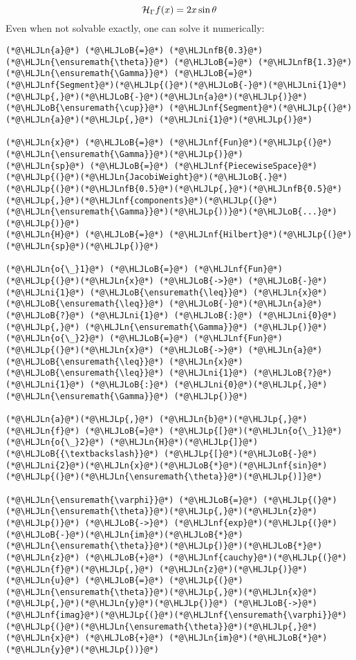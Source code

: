 \documentclass[12pt,landscape]{article}
\newcommand{\HLJLn}[1]{#1}
\newcommand{\HLJLnf}[1]{\textcolor[RGB]{66,102,213}{#1}}
\newcommand{\HLJLnfB}[1]{\textcolor[RGB]{59,151,46}{#1}}
\newcommand{\HLJLni}[1]{\textcolor[RGB]{59,151,46}{#1}}
\newcommand{\HLJLoB}[1]{\textcolor[RGB]{102,102,102}{\textbf{#1}}}
\newcommand{\HLJLp}[1]{#1}
\def\HH{ {\cal H} }
\begin{document}
{\[
\HH_\Gamma f(x) = 2 x  \sin \theta
\]
Even when not solvable exactly, one can solve it numerically:


\begin{lstlisting}
(*@\HLJLn{a}@*) (*@\HLJLoB{=}@*) (*@\HLJLnfB{0.3}@*)
(*@\HLJLn{\ensuremath{\theta}}@*) (*@\HLJLoB{=}@*) (*@\HLJLnfB{1.3}@*)
(*@\HLJLn{\ensuremath{\Gamma}}@*) (*@\HLJLoB{=}@*) (*@\HLJLnf{Segment}@*)(*@\HLJLp{(}@*)(*@\HLJLoB{-}@*)(*@\HLJLni{1}@*)(*@\HLJLp{,}@*)(*@\HLJLoB{-}@*)(*@\HLJLn{a}@*)(*@\HLJLp{)}@*) (*@\HLJLoB{\ensuremath{\cup}}@*) (*@\HLJLnf{Segment}@*)(*@\HLJLp{(}@*)(*@\HLJLn{a}@*)(*@\HLJLp{,}@*) (*@\HLJLni{1}@*)(*@\HLJLp{)}@*)

(*@\HLJLn{x}@*) (*@\HLJLoB{=}@*) (*@\HLJLnf{Fun}@*)(*@\HLJLp{(}@*)(*@\HLJLn{\ensuremath{\Gamma}}@*)(*@\HLJLp{)}@*)
(*@\HLJLn{sp}@*) (*@\HLJLoB{=}@*) (*@\HLJLnf{PiecewiseSpace}@*)(*@\HLJLp{(}@*)(*@\HLJLn{JacobiWeight}@*)(*@\HLJLoB{.}@*)(*@\HLJLp{(}@*)(*@\HLJLnfB{0.5}@*)(*@\HLJLp{,}@*)(*@\HLJLnfB{0.5}@*)(*@\HLJLp{,}@*)(*@\HLJLnf{components}@*)(*@\HLJLp{(}@*)(*@\HLJLn{\ensuremath{\Gamma}}@*)(*@\HLJLp{))}@*)(*@\HLJLoB{...}@*)(*@\HLJLp{)}@*)
(*@\HLJLn{H}@*) (*@\HLJLoB{=}@*) (*@\HLJLnf{Hilbert}@*)(*@\HLJLp{(}@*)(*@\HLJLn{sp}@*)(*@\HLJLp{)}@*)

(*@\HLJLn{o{\_}1}@*) (*@\HLJLoB{=}@*) (*@\HLJLnf{Fun}@*)(*@\HLJLp{(}@*)(*@\HLJLn{x}@*) (*@\HLJLoB{->}@*) (*@\HLJLoB{-}@*)(*@\HLJLni{1}@*) (*@\HLJLoB{\ensuremath{\leq}}@*) (*@\HLJLn{x}@*) (*@\HLJLoB{\ensuremath{\leq}}@*) (*@\HLJLoB{-}@*)(*@\HLJLn{a}@*) (*@\HLJLoB{?}@*) (*@\HLJLni{1}@*) (*@\HLJLoB{:}@*) (*@\HLJLni{0}@*)(*@\HLJLp{,}@*) (*@\HLJLn{\ensuremath{\Gamma}}@*) (*@\HLJLp{)}@*)
(*@\HLJLn{o{\_}2}@*) (*@\HLJLoB{=}@*) (*@\HLJLnf{Fun}@*)(*@\HLJLp{(}@*)(*@\HLJLn{x}@*) (*@\HLJLoB{->}@*) (*@\HLJLn{a}@*) (*@\HLJLoB{\ensuremath{\leq}}@*) (*@\HLJLn{x}@*) (*@\HLJLoB{\ensuremath{\leq}}@*) (*@\HLJLni{1}@*) (*@\HLJLoB{?}@*) (*@\HLJLni{1}@*) (*@\HLJLoB{:}@*) (*@\HLJLni{0}@*)(*@\HLJLp{,}@*) (*@\HLJLn{\ensuremath{\Gamma}}@*) (*@\HLJLp{)}@*)

(*@\HLJLn{a}@*)(*@\HLJLp{,}@*) (*@\HLJLn{b}@*)(*@\HLJLp{,}@*) (*@\HLJLn{f}@*) (*@\HLJLoB{=}@*) (*@\HLJLp{[}@*)(*@\HLJLn{o{\_}1}@*) (*@\HLJLn{o{\_}2}@*) (*@\HLJLn{H}@*)(*@\HLJLp{]}@*) (*@\HLJLoB{{\textbackslash}}@*) (*@\HLJLp{[}@*)(*@\HLJLoB{-}@*)(*@\HLJLni{2}@*)(*@\HLJLn{x}@*)(*@\HLJLoB{*}@*)(*@\HLJLnf{sin}@*)(*@\HLJLp{(}@*)(*@\HLJLn{\ensuremath{\theta}}@*)(*@\HLJLp{)]}@*)

(*@\HLJLn{\ensuremath{\varphi}}@*) (*@\HLJLoB{=}@*) (*@\HLJLp{(}@*)(*@\HLJLn{\ensuremath{\theta}}@*)(*@\HLJLp{,}@*)(*@\HLJLn{z}@*)(*@\HLJLp{)}@*) (*@\HLJLoB{->}@*) (*@\HLJLnf{exp}@*)(*@\HLJLp{(}@*)(*@\HLJLoB{-}@*)(*@\HLJLn{im}@*)(*@\HLJLoB{*}@*)(*@\HLJLn{\ensuremath{\theta}}@*)(*@\HLJLp{)}@*)(*@\HLJLoB{*}@*)(*@\HLJLn{z}@*) (*@\HLJLoB{+}@*) (*@\HLJLnf{cauchy}@*)(*@\HLJLp{(}@*)(*@\HLJLn{f}@*)(*@\HLJLp{,}@*) (*@\HLJLn{z}@*)(*@\HLJLp{)}@*)
(*@\HLJLn{u}@*) (*@\HLJLoB{=}@*) (*@\HLJLp{(}@*)(*@\HLJLn{\ensuremath{\theta}}@*)(*@\HLJLp{,}@*)(*@\HLJLn{x}@*)(*@\HLJLp{,}@*)(*@\HLJLn{y}@*)(*@\HLJLp{)}@*) (*@\HLJLoB{->}@*) (*@\HLJLnf{imag}@*)(*@\HLJLp{(}@*)(*@\HLJLnf{\ensuremath{\varphi}}@*)(*@\HLJLp{(}@*)(*@\HLJLn{\ensuremath{\theta}}@*)(*@\HLJLp{,}@*) (*@\HLJLn{x}@*) (*@\HLJLoB{+}@*) (*@\HLJLn{im}@*)(*@\HLJLoB{*}@*)(*@\HLJLn{y}@*)(*@\HLJLp{))}@*)


\end{lstlisting}}
\end{document}
